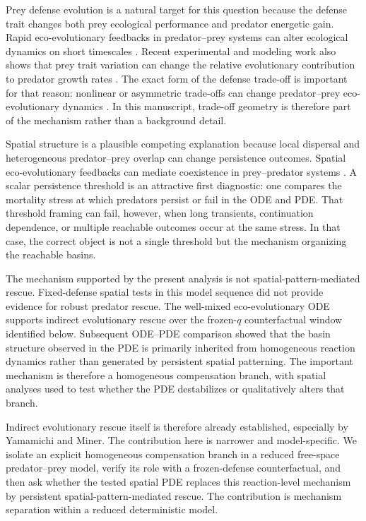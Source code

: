 \documentclass[11pt]{article}
\begin{document}
Prey defense evolution is a natural target for this question because the defense trait changes both prey ecological performance and predator energetic gain. Rapid eco-evolutionary feedbacks in predator--prey systems can alter ecological dynamics on short timescales \citep{YoshidaEtAl2003}. Recent experimental and modeling work also shows that prey trait variation can change the relative evolutionary contribution to predator growth rates \citep{HermannPantelReveillonBecks2024}. The exact form of the defense trade-off is important for that reason: nonlinear or asymmetric trade-offs can change predator--prey eco-evolutionary dynamics \citep{KasadaYamamichiYoshida2014}. In this manuscript, trade-off geometry is therefore part of the mechanism rather than a background detail.

Spatial structure is a plausible competing explanation because local dispersal and heterogeneous predator--prey overlap can change persistence outcomes. Spatial eco-evolutionary feedbacks can mediate coexistence in prey--predator systems \citep{ColomboMartinezGarciaLopezHernandezGarcia2019}. A scalar persistence threshold is an attractive first diagnostic: one compares the mortality stress at which predators persist or fail in the ODE and PDE. That threshold framing can fail, however, when long transients, continuation dependence, or multiple reachable outcomes occur at the same stress. In that case, the correct object is not a single threshold but the mechanism organizing the reachable basins.

The mechanism supported by the present analysis is not spatial-pattern-mediated rescue. Fixed-defense spatial tests in this model sequence did not provide evidence for robust predator rescue. The well-mixed eco-evolutionary ODE supports indirect evolutionary rescue over the frozen-\(q\) counterfactual window identified below. Subsequent ODE--PDE comparison showed that the basin structure observed in the PDE is primarily inherited from homogeneous reaction dynamics rather than generated by persistent spatial patterning. The important mechanism is therefore a homogeneous compensation branch, with spatial analyses used to test whether the PDE destabilizes or qualitatively alters that branch.

Indirect evolutionary rescue itself is therefore already established, especially by Yamamichi and Miner. The contribution here is narrower and model-specific. We isolate an explicit homogeneous compensation branch in a reduced free-space predator--prey model, verify its role with a frozen-defense counterfactual, and then ask whether the tested spatial PDE replaces this reaction-level mechanism by persistent spatial-pattern-mediated rescue. The contribution is mechanism separation within a reduced deterministic model.
\end{document}
